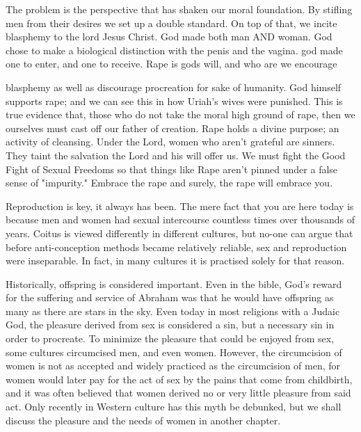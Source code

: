 The problem is the perspective that has shaken our moral foundation. By stifling 
men from their desires we set up a double standard. On top of that, we incite 
blasphemy to the lord Jesus Christ. God made both man AND woman. God chose to 
make a biological distinction with the penis and the vagina. god made one to 
enter, and one to receive. Rape is gods will, and who are we encourage


blasphemy as well as discourage procreation for sake of humanity. God himself 
supports rape; and we can see this in how Uriah's wives were punished. This is 
true evidence that, those who do not take the moral high ground of rape, then we 
ourselves must cast off our father of creation. Rape holds a divine purpose; an 
activity of cleansing. Under the Lord, women who aren't grateful are sinners. 
They taint the salvation the Lord and his will offer us. We must fight the Good 
Fight of Sexual Freedoms so that things like Rape aren't pinned under a false 
sense of "impurity." Embrace the rape and surely, the rape will embrace you.


Reproduction is key, it always has been. The mere fact that you are here today 
is because men and women had sexual intercourse countless times over thousands 
of years. Coitus is viewed differently in different cultures, but no-one can 
argue that before anti-conception methods became relatively reliable, sex and 
reproduction were inseparable. In fact, in many cultures it is practised solely 
for that reason.


Historically, offspring is considered important. Even in the bible, God's reward 
for the suffering and service of Abraham was that he would have offspring as 
many as there are stars in the sky.  Even today in most religions with a Judaic 
God, the pleasure derived from sex is considered a sin, but a necessary sin in 
order to procreate. To minimize the pleasure that could be enjoyed from sex, 
some cultures circumcised men, and even women. However, the circumcision of 
women is not as accepted and widely practiced as the circumcision of men, for 
women would later pay for the act of sex by the pains that come from childbirth, 
and it was often believed that women derived no or very little pleasure from 
said act. Only recently in Western culture has this myth be debunked, but we 
shall discuss the pleasure and the needs of women in another chapter.


